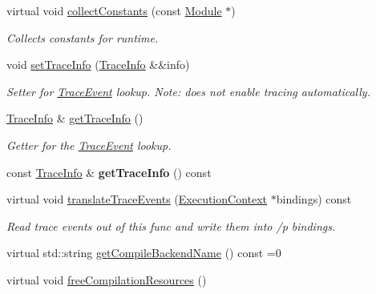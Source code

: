 \begin{DoxyCompactItemize}
\mbox{\label{classglow_1_1_compiled_function_af6476dd3d859d918f7ecc8a997869a05}} 
virtual void \hyperlink{classglow_1_1_compiled_function_af6476dd3d859d918f7ecc8a997869a05}{collect\+Constants} (const \hyperlink{classglow_1_1_module}{Module} $\ast$)
\begin{DoxyCompactList}\small\item\em Collects constants for runtime. \end{DoxyCompactList}\item 
\mbox{\label{classglow_1_1_compiled_function_a2e1024bbff4eae7b595390d7f572341d}} 
void \hyperlink{classglow_1_1_compiled_function_a2e1024bbff4eae7b595390d7f572341d}{set\+Trace\+Info} (\hyperlink{structglow_1_1_trace_info}{Trace\+Info} \&\&info)
\begin{DoxyCompactList}\small\item\em Setter for \hyperlink{structglow_1_1_trace_event}{Trace\+Event} lookup. Note\+: does not enable tracing automatically. \end{DoxyCompactList}\item 
\mbox{\label{classglow_1_1_compiled_function_a90bd89ccb20d05eb0bcb57c189d5fcad}} 
\hyperlink{structglow_1_1_trace_info}{Trace\+Info} \& \hyperlink{classglow_1_1_compiled_function_a90bd89ccb20d05eb0bcb57c189d5fcad}{get\+Trace\+Info} ()
\begin{DoxyCompactList}\small\item\em Getter for the \hyperlink{structglow_1_1_trace_event}{Trace\+Event} lookup. \end{DoxyCompactList}\item 
\mbox{\label{classglow_1_1_compiled_function_a7bb179e03ca226aef1b2053eb2a08b78}} 
const \hyperlink{structglow_1_1_trace_info}{Trace\+Info} \& {\bfseries get\+Trace\+Info} () const
\item 
\mbox{\label{classglow_1_1_compiled_function_ab2c21d3d37661c8f7bc0629c19b1fa27}} 
virtual void \hyperlink{classglow_1_1_compiled_function_ab2c21d3d37661c8f7bc0629c19b1fa27}{translate\+Trace\+Events} (\hyperlink{classglow_1_1_execution_context}{Execution\+Context} $\ast$bindings) const
\begin{DoxyCompactList}\small\item\em Read trace events out of this func and write them into /p bindings. \end{DoxyCompactList}\item 
virtual std\+::string \hyperlink{classglow_1_1_compiled_function_a7b3f2b17986d14706a1d1091d3c4df27}{get\+Compile\+Backend\+Name} () const =0
\item 
virtual void \hyperlink{classglow_1_1_compiled_function_a0bd30fa8ff4f317ac14ae1c02898ed1a}{free\+Compilation\+Resources} ()
\end{DoxyCompactItemize}
